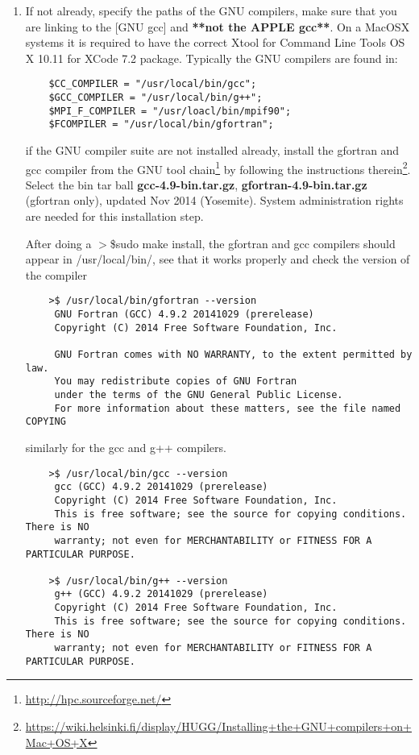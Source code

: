 \documentclass[review]{elsarticle}
\begin{document}
\begin{enumerate}
\item \label{compilers} If not already, specify the paths of the GNU
  compilers, make sure that you are linking to the [GNU gcc] and
  {\bf{**not the APPLE gcc**}}. On a MacOSX systems it is required to have the
  correct Xtool for Command Line Tools OS X 10.11 for XCode 7.2
  package. Typically the GNU compilers are found in: 
\begin{verbatim}
    $CC_COMPILER = "/usr/local/bin/gcc";
    $GCC_COMPILER = "/usr/local/bin/g++";
    $MPI_F_COMPILER = "/usr/loacl/bin/mpif90";
    $FCOMPILER = "/usr/local/bin/gfortran";
\end{verbatim}

if the GNU compiler suite are not installed already, install the
gfortran and gcc compiler from the GNU tool
chain\footnote{\url{http://hpc.sourceforge.net/}} by following the
instructions therein\footnote{
\url{https://wiki.helsinki.fi/display/HUGG/Installing+the+GNU+compilers+on+Mac+OS+X}}.
Select the bin tar ball {\bf{gcc-4.9-bin.tar.gz}},
{\bf{gfortran-4.9-bin.tar.gz}} (gfortran only), updated Nov 2014
(Yosemite). System administration rights are needed for this
installation step.

After doing a $>$\$sudo make install, the gfortran and gcc compilers
should appear in /usr/local/bin/, see that it works properly and check
the version of the compiler

\begin{verbatim}
    >$ /usr/local/bin/gfortran --version 
     GNU Fortran (GCC) 4.9.2 20141029 (prerelease)
     Copyright (C) 2014 Free Software Foundation, Inc.

     GNU Fortran comes with NO WARRANTY, to the extent permitted by law.
     You may redistribute copies of GNU Fortran
     under the terms of the GNU General Public License.
     For more information about these matters, see the file named COPYING
\end{verbatim}

similarly for the gcc and g++ compilers.

\begin{verbatim}
    >$ /usr/local/bin/gcc --version
     gcc (GCC) 4.9.2 20141029 (prerelease)
     Copyright (C) 2014 Free Software Foundation, Inc.
     This is free software; see the source for copying conditions.  There is NO
     warranty; not even for MERCHANTABILITY or FITNESS FOR A PARTICULAR PURPOSE.

    >$ /usr/local/bin/g++ --version 
     g++ (GCC) 4.9.2 20141029 (prerelease)
     Copyright (C) 2014 Free Software Foundation, Inc.
     This is free software; see the source for copying conditions.  There is NO
     warranty; not even for MERCHANTABILITY or FITNESS FOR A PARTICULAR PURPOSE.
\end{verbatim}


\end{enumerate}
\end{document}
